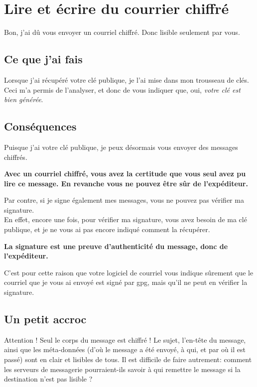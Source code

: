 \chapter{Lire et écrire du courrier chiffré}

Bon, j'ai dû vous envoyer un courriel chiffré. Donc lisible seulement
par vous.

\section{Ce que j'ai fais}\label{ce-que-jai-fais}

Lorsque j'ai récupéré votre clé publique, je l'ai mise dans mon
trousseau de clés.\\Ceci m'a permis de l'analyser, et donc de vous
indiquer que, oui, \emph{votre clé est bien générée}.

\section{Conséquences}\label{consuxe9quences}

Puisque j'ai votre clé publique, je peux désormais vous envoyer des
messages chiffrés.

\textbf{Avec un courriel chiffré, vous avez la certitude que vous seul
avez pu lire ce message. En revanche vous ne pouvez être sûr de
l'expéditeur.}

Par contre, si je signe également mes messages, vous ne pouvez pas
vérifier ma signature.\\En effet, encore une fois, pour vérifier ma
signature, vous avez besoin de ma clé publique, et je ne vous ai pas
encore indiqué comment la récupérer.

\textbf{La signature est une preuve d'authenticité du message, donc de
l'expéditeur.}

C'est pour cette raison que votre logiciel de courriel vous indique
sûrement que le courriel que je vous ai envoyé est signé par gpg, mais
qu'il ne peut en vérifier la signature.

\section{Un petit accroc}\label{un-petit-accroc}

Attention ! Seul le corps du message est chiffré ! Le sujet, l'en-tête
du message, ainsi que les méta-données (d'où le message a été envoyé, à
qui, et par où il est passé) sont en clair et lisibles de tous. Il est
difficile de faire autrement: comment les serveurs de messagerie
pourraient-ils savoir à qui remettre le message si la destination n'est
pas lisible ?

